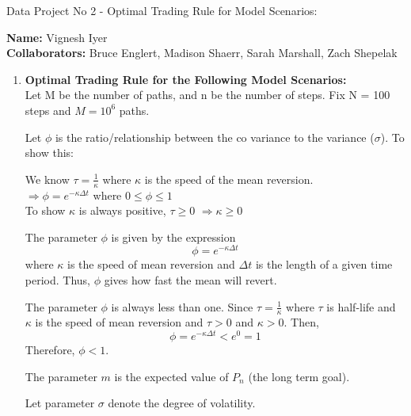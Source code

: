 \documentclass[12pt]{article}
\begin{document}
 
\begin{title}
{Data Project No 2 - Optimal Trading Rule for Model Scenarios: }
\end{title}
\begin{author}
{\textbf{Name:} Vignesh Iyer 
\\ \textbf{Collaborators:} Bruce Englert, Madison Shaerr, Sarah Marshall, Zach Shepelak}
\end{author}
\maketitle


\begin{enumerate}


 \bigskip
\item\textbf{Optimal Trading Rule for the Following Model Scenarios:}
\\Let M be the number of paths, and n be the number of steps. Fix N = 100 steps and $M = 10^{6}$ paths.

Let $\phi$ is the ratio/relationship between the co variance to the variance ($\sigma$). 
To show this: 
\begin{center}
We know $\tau = \frac{1}{\kappa}$ where $\kappa$ is the speed of the mean reversion. 
\\ $\Longrightarrow \phi = e^{-\kappa\Delta t}$ where $0 \leq \phi \leq 1$
\\ To show $\kappa$ is always positive, $\tau \geq 0$ $\Longrightarrow \kappa \geq 0$
\end{center}

The parameter $\phi$ is given by the expression
$$\phi = e^{-\kappa \Delta t}$$
where $\kappa$ is the speed of mean reversion and $\Delta t$ is the length of a given time period. Thus, $\phi$ gives how fast the mean will revert.

\vskip 10pt

The parameter $\phi$ is always less than one. Since $\tau = \frac{1}{\kappa}$ where $\tau$ is half-life and $\kappa$ is the speed of mean reversion and $\tau > 0$ and $\kappa > 0$. Then,
$$\phi = e^{-\kappa \Delta t} < e^0 = 1$$
Therefore, $\phi < 1$.

\vskip 10pt

The parameter $m$ is the expected value of $P_{n}$ (the long term goal).

\vskip 10pt

Let parameter $\sigma$ denote the degree of volatility.

\vskip 10pt


\end{enumerate}
\end{document}
